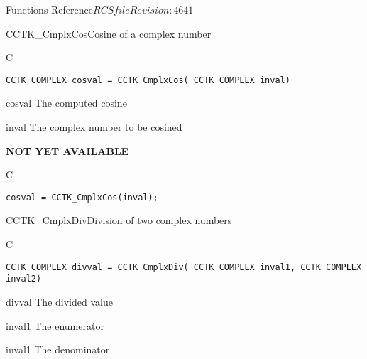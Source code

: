 \begin{cactuspart}{ Functions Reference}{$RCSfile$}{$Revision: 4641 $}
\begin{FunctionDescription}{CCTK\_CmplxCos}{Cosine of a complex number}
\label{CCTK-CmplxCos}
\begin{SynopsisSection}
\begin{Synopsis}{C}
\begin{verbatim}CCTK_COMPLEX cosval = CCTK_CmplxCos( CCTK_COMPLEX inval)\end{verbatim}
\end{Synopsis}
\end{SynopsisSection}
\begin{ParameterSection}
\begin{Parameter}{cosval}
The computed cosine
\end{Parameter}
\begin{Parameter}{inval}
The complex number to be cosined
\end{Parameter}
\end{ParameterSection}
\begin{Discussion}
{\bf NOT YET AVAILABLE}
\end{Discussion}
\begin{ExampleSection}
\begin{Example}{C}
\begin{verbatim}
cosval = CCTK_CmplxCos(inval);
\end{verbatim}
\end{Example}
\end{ExampleSection}
\end{FunctionDescription}


\begin{FunctionDescription}{CCTK\_CmplxDiv}{Division of two complex numbers}
\label{CCTK-CmplxDiv}
\begin{SynopsisSection}
\begin{Synopsis}{C}
\begin{verbatim}CCTK_COMPLEX divval = CCTK_CmplxDiv( CCTK_COMPLEX inval1, CCTK_COMPLEX inval2)\end{verbatim}
\end{Synopsis}
\end{SynopsisSection}
\begin{ParameterSection}
\begin{Parameter}{divval}
The divided value
\end{Parameter}
\begin{Parameter}{inval1}
The enumerator
\end{Parameter}
\begin{Parameter}{inval1}
The denominator
\end{Parameter}
\end{ParameterSection}


\end{FunctionDescription}
\end{cactuspart}
